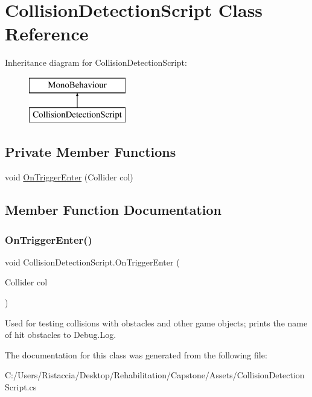 \hypertarget{class_collision_detection_script}{}\section{Collision\+Detection\+Script Class Reference}
\label{class_collision_detection_script}
Inheritance diagram for Collision\+Detection\+Script\+:\begin{figure}[H]
\begin{center}
\leavevmode
\includegraphics[height=2.000000cm]{class_collision_detection_script}
\end{center}
\end{figure}
\subsection*{Private Member Functions}
\begin{DoxyCompactItemize}
\item 
void \hyperlink{class_collision_detection_script_aad2fe0da7fc3fe0a12678adca35d2c08}{On\+Trigger\+Enter} (Collider col)
\end{DoxyCompactItemize}


\subsection{Member Function Documentation}
\mbox{\label{class_collision_detection_script_aad2fe0da7fc3fe0a12678adca35d2c08}} 
\subsubsection{\texorpdfstring{On\+Trigger\+Enter()}{OnTriggerEnter()}}
{\footnotesize\ttfamily void Collision\+Detection\+Script.\+On\+Trigger\+Enter (\begin{DoxyParamCaption}\item[{Collider}]{col }\end{DoxyParamCaption})\hspace{0.3cm}{\ttfamily [private]}}

Used for testing collisions with obstacles and other game objects; prints the name of hit obstacles to Debug.\+Log. 

The documentation for this class was generated from the following file\+:\begin{DoxyCompactItemize}
\item 
C\+:/\+Users/\+Ristaccia/\+Desktop/\+Rehabilitation/\+Capstone/\+Assets/Collision\+Detection\+Script.\+cs\end{DoxyCompactItemize}
